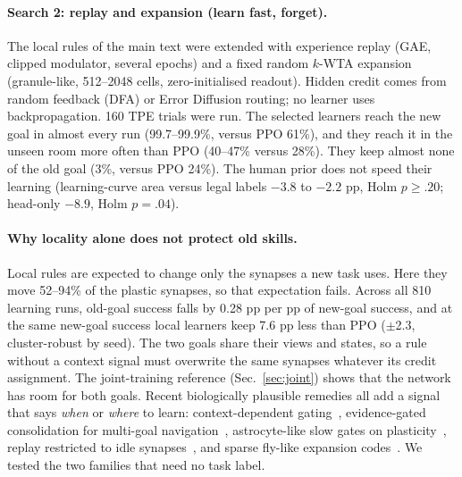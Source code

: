 \documentclass[10pt,onecolumn,letterpaper]{article}
\begin{document}
\paragraph{Search 2: replay and expansion (learn fast, forget).} The local rules of the main text were extended with
experience replay (GAE, clipped modulator, several epochs) and a fixed random $k$-WTA expansion (granule-like, 512--2048
cells, zero-initialised readout). Hidden credit comes from random feedback (DFA) or Error Diffusion routing; no learner
uses backpropagation. 160 TPE trials were run. The selected learners reach the new goal in almost every run (99.7--99.9\%,
versus PPO 61\%), and they reach it in the unseen room more often than PPO (40--47\% versus 28\%). They keep almost none of the old
goal (3\%, versus PPO 24\%). The human prior does not speed their learning (learning-curve area versus legal labels
$-3.8$ to $-2.2$ pp, Holm $p\geq.20$; head-only $-8.9$, Holm $p=.04$).

\paragraph{Why locality alone does not protect old skills.} Local rules are expected to change only the synapses a new task
uses. Here they move 52--94\% of the plastic synapses, so that expectation fails. Across all 810 learning runs,
old-goal success falls by 0.28 pp per pp of new-goal success, and at the same new-goal success local learners keep
7.6 pp less than PPO ($\pm$2.3, cluster-robust by seed). The two goals share their views and states, so a rule without a
context signal must overwrite the same synapses whatever its credit assignment. The joint-training reference
(Sec.~\ref{sec:joint}) shows that the network has room for both goals. Recent biologically plausible remedies all add a
signal that says \emph{when} or \emph{where} to learn: context-dependent gating~\cite{masse2018xdg}, evidence-gated
consolidation for multi-goal navigation~\cite{neymotin2026evidence}, astrocyte-like slow gates on
plasticity~\cite{dong2026astrocyte}, replay restricted to idle synapses~\cite{zhang2026silent}, and sparse fly-like
expansion codes~\cite{shen2023fly}. We tested the two families that need no task label.
\end{document}
